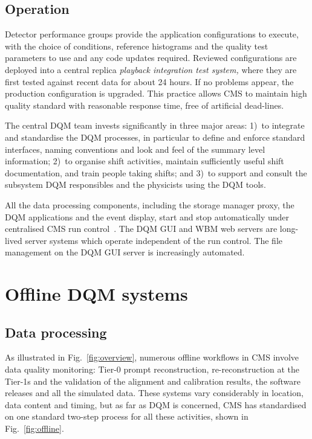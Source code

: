 \documentclass[a4paper]{jpconf}
\begin{document}
\subsection{Operation}

Detector performance groups provide the application configurations to execute,
with the choice of conditions, reference histograms and the quality test
parameters to use and any code updates required.  Reviewed configurations are
deployed into a central replica {\em playback integration test system,} where
they are first tested against recent data for about 24 hours.  If no problems
appear, the production configuration is upgraded.  This practice allows CMS to
maintain high quality standard with reasonable response time, free of
artificial dead-lines.

The central DQM team invests significantly in three major areas: 1)~to
integrate and standardise the DQM processes, in particular to define and
enforce standard interfaces, naming conventions and look and feel of the
summary level information; 2)~to organise shift activities, maintain
sufficiently useful shift documentation, and train people taking shifts; and
3)~to support and consult the subsystem DQM responsibles and the physicists
using the DQM tools.

All the data processing components, including the storage manager proxy, the
DQM applications and the event display, start and stop automatically under
centralised CMS run control~\cite{runcontrol}.  The DQM GUI and WBM web
servers are long-lived server systems which operate independent of the run
control.  The file management on the DQM GUI server is increasingly automated.


\section{Offline DQM systems}
\subsection{Data processing}

As illustrated in Fig.~\ref{fig:overview}, numerous offline workflows in CMS
involve data quality monitoring: Tier-0 prompt reconstruction,
re-reconstruction at the Tier-1s and the validation of the alignment and
calibration results, the software releases and all the simulated data.  These
systems vary considerably in location, data content and timing, but as far as
DQM is concerned, CMS has standardised on one standard two-step process for
all these activities, shown in Fig.~\ref{fig:offline}.
\end{document}
